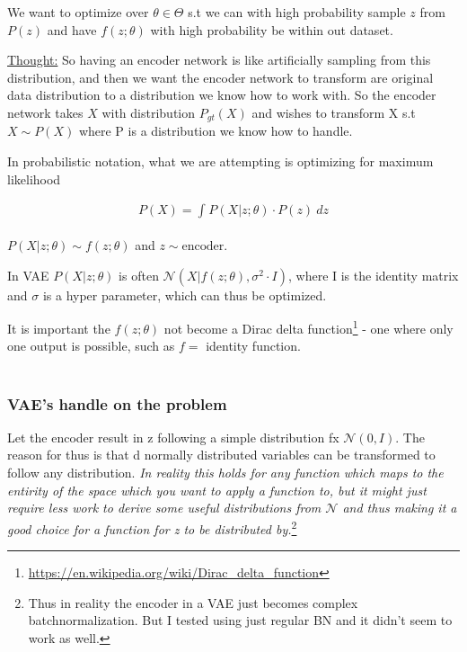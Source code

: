 \documentclass[12pt,a4paper]{report}
\begin{document}
We want to optimize over \(\theta \in \Theta\) s.t we can with high probability sample \(z\) from \(P(z)\) and have \(f(z;\theta)\) with high probability be within out dataset.
\\ \vspace{0.3cm}

\underline{Thought:}
So having an encoder network is like artificially sampling from this distribution, and then we want the encoder network to transform are original data distribution to a distribution we know how to work with. 
So the encoder network takes \(X\) with distribution \(P_{gt}(X)\) and wishes to transform X s.t \(X \sim P(X)\) where P is a distribution we know how to handle.
\\ \vspace{0.3cm}

In probabilistic notation, what we are attempting is optimizing for maximum likelihood 

\setcounter{equation}{0}
\begin{align*}
P(X) = \int_{}^{} P(X|z;\theta) \cdot P(z) ~ dz
\end{align*}

\(P(X|z;\theta)\sim f(z;\theta)\) and \(z \sim \text{encoder}\).
\\ \vspace{0.3cm}

In VAE \(P(X|z;\theta)\) is often \(\mathcal{N}(X|f(z;\theta), \sigma^{2} \cdot I)\), where I is the identity matrix and \(\sigma\) is a hyper parameter, which can thus be optimized.
\\ \vspace{0.3cm}

It is important the \(f(z;\theta)\) not become a Dirac delta function\footnote{\url{https://en.wikipedia.org/wiki/Dirac_delta_function}} - one where only one output is possible, such as \(f =\) identity function.\\
\\ \vspace{0.3cm}

\subsubsection{VAE's handle on the problem}

Let the encoder result in z following a simple distribution fx \(\mathcal{N}(0,I)\).
The reason for thus is that d normally distributed variables can be transformed to follow any distribution. \emph{In reality this holds for any function which maps to the entirity of the space which you want to apply a function to, but it might just require less work to derive some useful distributions from \(\mathcal{N}\) and thus making it a good choice for a function for z to be distributed by.}\footnote{Thus in reality the encoder in a VAE just becomes complex batchnormalization. But I tested using just regular BN and it didn't seem to work as well.}
\\ \vspace{0.3cm}
\end{document}

